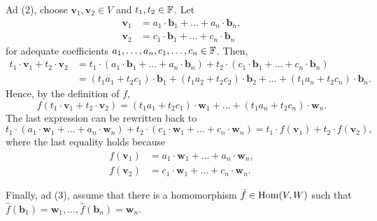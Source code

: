 \begin{thmproof}
 Ad (2), choose $\mathbf{v}_1,\mathbf{v}_2 \in V$ and $t_1,t_2 \in \mathbb{F}$. Let
 \begin{align*}
  \mathbf{v}_1 &= a_1 \cdot \mathbf{b}_1 + \ldots + a_n \cdot \mathbf{b}_n,\\
  \mathbf{v}_2 &= c_1 \cdot \mathbf{b}_1 + \ldots + c_n \cdot \mathbf{b}_n
 \end{align*}
 for adequate coefficients $a_1,\ldots,a_n,c_1,\ldots,c_n \in \mathbb{F}$. Then,
 \begin{align*}
  t_1 \cdot \mathbf{v}_1 + t_2 \cdot \mathbf{v}_2 
  &= t_1 \cdot (a_1 \cdot \mathbf{b}_1 + \ldots + a_n \cdot \mathbf{b}_n) + t_2
  \cdot (c_1 \cdot \mathbf{b}_1 + \ldots + c_n \cdot \mathbf{b}_n)\\
  &=(t_1a_1 + t_2c_1) \cdot \mathbf{b}_1 + (t_1a_2 + t_2c_2) \cdot \mathbf{b}_2
  + \ldots + (t_1a_n + t_2c_n) \cdot \mathbf{b}_n.
 \end{align*}
 Hence, by the definition of $f$,
 \[
  f(t_1 \cdot \mathbf{v}_1 + t_2 \cdot \mathbf{v}_2) = (t_1a_1 + t_2c_1) \cdot
  \mathbf{w}_1 + \ldots + (t_1a_n + t_2c_n) \cdot \mathbf{w}_n.
 \]
 The last expression can be rewritten back to
 \[
  t_1 \cdot (a_1 \cdot \mathbf{w}_1 + \ldots + a_n \cdot \mathbf{w}_n) + t_2
  \cdot (c_1 \cdot \mathbf{w}_1 + \ldots + c_n \cdot \mathbf{w}_n) = t_1 \cdot
  f(\mathbf{v}_1) + t_2 \cdot f(\mathbf{v}_2),
 \]
 where the last equality holds because
 \begin{align*}
  f(\mathbf{v}_1) &= a_1 \cdot \mathbf{w}_1 + \ldots + a_n \cdot \mathbf{w}_n,\\
  f(\mathbf{v}_2) &= c_1 \cdot \mathbf{w}_1 + \ldots + c_n \cdot \mathbf{w}_n.
 \end{align*}

 Finally, ad (3), assume that there is a homomorphism $\hat{f} \in \operatorname{Hom}(V,W)$
 such that $\hat{f}(\mathbf{b}_1) = \mathbf{w}_1, \ldots, \hat{f}(\mathbf{b}_n)
 = \mathbf{w}_n$.
\end{thmproof}
